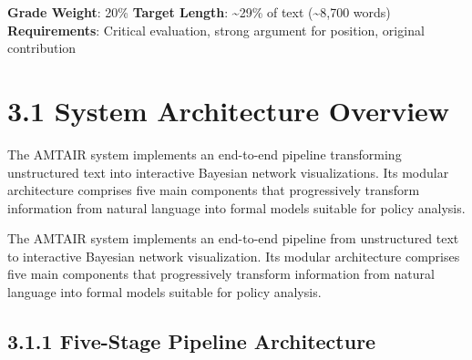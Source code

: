 \documentclass[
  11pt,
  letterpaper,
]{book}
\begin{document}

\begin{tcolorbox}[enhanced jigsaw, arc=.35mm, titlerule=0mm, breakable, toprule=.15mm, toptitle=1mm, colframe=quarto-callout-note-color-frame, coltitle=black, bottomrule=.15mm, bottomtitle=1mm, opacityback=0, title=\textcolor{quarto-callout-note-color}{\faInfo}\hspace{0.5em}{Chapter Overview}, rightrule=.15mm, leftrule=.75mm, colback=white, colbacktitle=quarto-callout-note-color!10!white, opacitybacktitle=0.6, left=2mm]

\textbf{Grade Weight}: 20\% \textbar{} \textbf{Target Length}:
\textasciitilde29\% of text (\textasciitilde8,700 words)\\
\textbf{Requirements}: Critical evaluation, strong argument for
position, original contribution

\end{tcolorbox}

\section*{3.1 System Architecture
Overview}\label{sec-system-architecture}


The AMTAIR system implements an end-to-end pipeline transforming
unstructured text into interactive Bayesian network visualizations. Its
modular architecture comprises five main components that progressively
transform information from natural language into formal models suitable
for policy analysis.

The AMTAIR system implements an end-to-end pipeline from unstructured
text to interactive Bayesian network visualization. Its modular
architecture comprises five main components that progressively transform
information from natural language into formal models suitable for policy
analysis.

\subsection*{3.1.1 Five-Stage Pipeline
Architecture}\label{sec-five-stage-pipeline}
\end{document}
